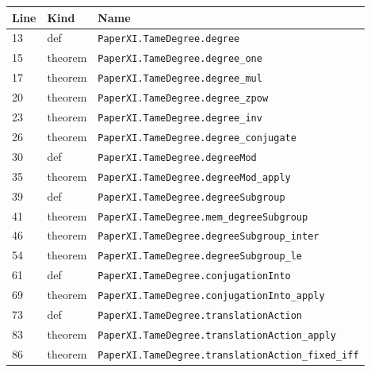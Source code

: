 \documentclass[10pt,oneside]{book}
\begin{document}
\begin{longtable}{@{}p{}p{}p{}@{}}\toprule Line&Kind&Name\\\midrule\endhead

13&def&\nolinkurl{PaperXI.TameDegree.degree}\\

15&theorem&\nolinkurl{PaperXI.TameDegree.degree_one}\\

17&theorem&\nolinkurl{PaperXI.TameDegree.degree_mul}\\

20&theorem&\nolinkurl{PaperXI.TameDegree.degree_zpow}\\

23&theorem&\nolinkurl{PaperXI.TameDegree.degree_inv}\\

26&theorem&\nolinkurl{PaperXI.TameDegree.degree_conjugate}\\

30&def&\nolinkurl{PaperXI.TameDegree.degreeMod}\\

35&theorem&\nolinkurl{PaperXI.TameDegree.degreeMod_apply}\\

39&def&\nolinkurl{PaperXI.TameDegree.degreeSubgroup}\\

41&theorem&\nolinkurl{PaperXI.TameDegree.mem_degreeSubgroup}\\

46&theorem&\nolinkurl{PaperXI.TameDegree.degreeSubgroup_inter}\\

54&theorem&\nolinkurl{PaperXI.TameDegree.degreeSubgroup_le}\\

61&def&\nolinkurl{PaperXI.TameDegree.conjugationInto}\\

69&theorem&\nolinkurl{PaperXI.TameDegree.conjugationInto_apply}\\

73&def&\nolinkurl{PaperXI.TameDegree.translationAction}\\

83&theorem&\nolinkurl{PaperXI.TameDegree.translationAction_apply}\\

86&theorem&\nolinkurl{PaperXI.TameDegree.translationAction_fixed_iff}\\


\end{longtable}
\end{document}
